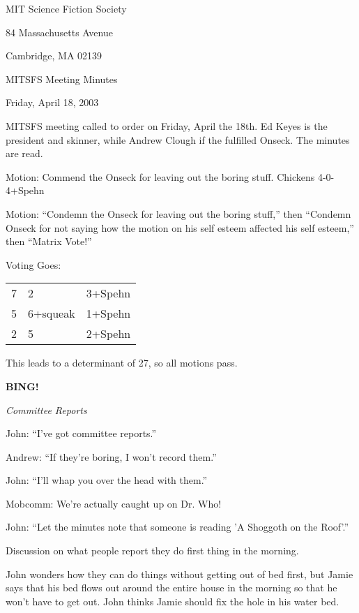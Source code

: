 \documentclass[12pt]{article}
\newcommand{\bing}{{\bf BING!} }
\newcommand{\goto}[1]{\bing \vskip 12pt \centerline{{\em{#1}}}}
\begin{document}
\begin{center}

MIT Science Fiction Society 

84 Massachusetts Avenue

Cambridge, MA 02139

\vspace{12pt}

MITSFS Meeting Minutes 

Friday, April 18, 2003

\end{center}
 
\vspace{18pt}

\setlength{\parskip}{6pt}

\noindent
MITSFS meeting called to order on Friday, April the 18th.  Ed Keyes is the president and skinner, while Andrew Clough if the fulfilled Onseck.  The minutes are read.

Motion:  Commend the Onseck for leaving out the boring stuff.  Chickens 4-0-4+Spehn

Motion: ``Condemn the Onseck for leaving out the boring stuff,'' then ``Condemn Onseck for not saying how the motion on his self esteem affected his self esteem,'' then ``Matrix Vote!''

Voting Goes:

\begin{tabular}{clr}
7& 2& 3+Spehn\\ 5& 6+squeak& 1+Spehn\\ 2& 5& 2+Spehn\\
\end{tabular}

This leads to a determinant of 27, so all motions pass.

\goto{Committee Reports}

John: ``I've got committee reports.''

Andrew:  ``If they're boring, I won't record them.''

John:  ``I'll whap you over the head with them.''

Mobcomm:  We're actually caught up on Dr. Who!

John:  ``Let the minutes note that someone is reading 'A Shoggoth on the Roof'.''

Discussion on what people report they do first thing in the morning.

John wonders how they can do things without getting out of bed first, but Jamie says that his bed flows out around the entire house in the morning so that he won't have to get out.  John thinks Jamie should fix the hole in his water bed.
\end{document}
